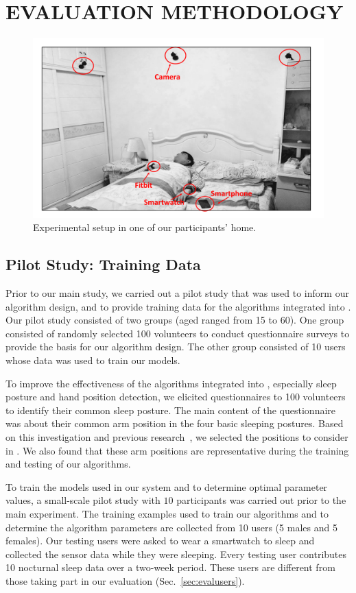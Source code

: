 \section{EVALUATION METHODOLOGY}\label{sec:expsetup}


\begin{figure}[!t]
	\centering
	\includegraphics[width=0.57\linewidth]{Figures/setup.pdf}
	\caption{Experimental setup in one of our participants' home. }\label{fig:setup}
\end{figure}

\subsection{{Pilot Study: Training Data}}\label{sec:trainingdata}

Prior to our main study, we carried out a pilot study that was used to inform our algorithm design, and to provide training data for the
algorithms integrated into {\systemname}. Our pilot study consisted of two groups (aged ranged from 15 to 60). One group   {consisted of}
randomly selected 100 volunteers to conduct questionnaire surveys to provide the basis for our algorithm design. The other group consisted
of 10 users whose data was used to train our models.


To improve the effectiveness of the algorithms integrated into {\systemname}, especially sleep posture and hand position detection, we
elicited questionnaires to 100 volunteers to identify their common sleep posture. The main content of the questionnaire was about their
common arm position in the four basic sleeping postures. Based on this investigation and previous
research~\cite{position2014,HandPosition2}, we selected the positions to consider in {\systemname}. We also found that these arm positions
are representative during the training and testing of our algorithms.

To train the models used in our system and to determine optimal parameter values, a small-scale pilot study with $10$ participants was
carried out prior to the main experiment. The training examples used to train our algorithms and to determine the algorithm parameters are
collected from 10 users (5 males and 5 females). Our testing users were asked to wear a smartwatch to sleep and collected the sensor data
while they were sleeping. Every testing user contributes 10 nocturnal sleep data over a two-week period. These users are different from
those taking part in our evaluation (Sec.~\ref{sec:evalusers}).


